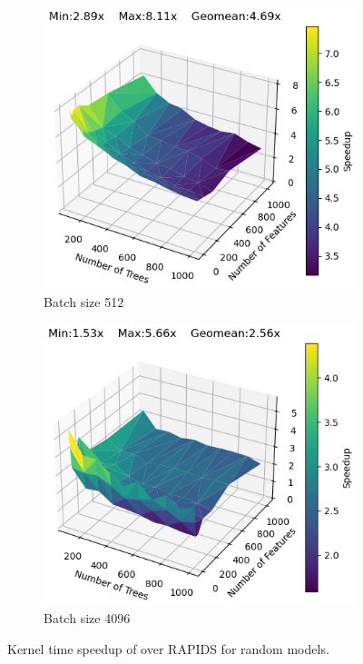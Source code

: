 \begin{figure}[htb]
  \begin{subfigure}[t]{.475\linewidth}
    \includegraphics[width=\linewidth]{figures/RandomModels/kernel_speedup_b512_depth8.png}
    \caption{Batch size 512}
  \end{subfigure}
  \begin{subfigure}[t]{.475\linewidth}
    \includegraphics[width=\linewidth]{figures/RandomModels/kernel_speedup_b4096_depth6.png}
    \caption{Batch size 4096}
  \end{subfigure}
  \caption{\label{fig:randomModels4060}Kernel time speedup of \Treebeard{} over RAPIDS for random models.
  }
\end{figure}

